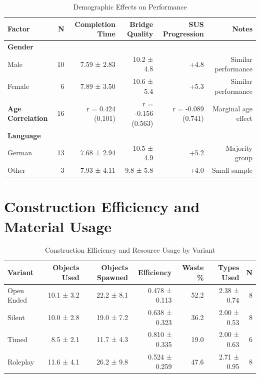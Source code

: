 \begin{table}[H]
\centering
\caption{Demographic Effects on Performance}
\label{tab:demographics_performance_complete}
\begin{tabular}{lrrrrr}
\toprule
\textbf{Factor} & \textbf{N} & \textbf{Completion Time} & \textbf{Bridge Quality} & \textbf{SUS Progression} & \textbf{Notes} \\
\midrule
\textbf{Gender} & & & & & \\
Male & 10 & 7.59 ± 2.83 & 10.2 ± 4.8 & +4.8 & Similar performance \\
Female & 6 & 7.89 ± 3.50 & 10.6 ± 5.4 & +5.3 & Similar performance \\
\midrule
\textbf{Age Correlation} & 16 & r = 0.424 (0.101) & r = -0.156 (0.563) & r = -0.089 (0.741) & Marginal age effect \\
\midrule
\textbf{Language} & & & & & \\
German & 13 & 7.68 ± 2.94 & 10.5 ± 4.9 & +5.2 & Majority group \\
Other & 3 & 7.93 ± 4.11 & 9.8 ± 5.8 & +4.0 & Small sample \\
\bottomrule
\end{tabular}
\end{table}

\section{Construction Efficiency and Material Usage}
\label{appendix:construction}

\begin{table}[H]
\centering
\caption{Construction Efficiency and Resource Usage by Variant}
\label{tab:construction_complete}
\begin{tabular}{lrrrrrr}
\toprule
\textbf{Variant} & \textbf{Objects Used} & \textbf{Objects Spawned} & \textbf{Efficiency} & \textbf{Waste \%} & \textbf{Types Used} & \textbf{N} \\
\midrule
Open Ended & 10.1 ± 3.2 & 22.2 ± 8.1 & 0.478 ± 0.113 & 52.2 & 2.38 ± 0.74 & 8 \\
Silent & 10.0 ± 2.8 & 19.0 ± 7.2 & 0.638 ± 0.323 & 36.2 & 2.00 ± 0.53 & 8 \\
Timed & 8.5 ± 2.1 & 11.7 ± 4.3 & 0.810 ± 0.335 & 19.0 & 2.00 ± 0.63 & 6 \\
Roleplay & 11.6 ± 4.1 & 26.2 ± 9.8 & 0.524 ± 0.259 & 47.6 & 2.71 ± 0.95 & 8 \\
\bottomrule
\end{tabular}
\end{table}

